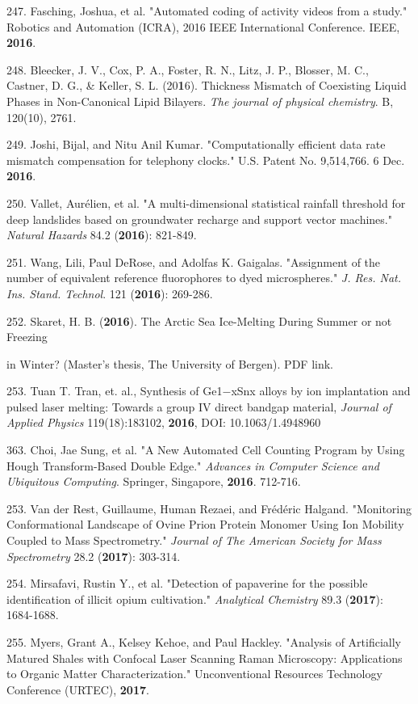 247. Fasching, Joshua, et al. "Automated coding of activity videos from a study." Robotics and Automation (ICRA), 2016 IEEE International Conference. IEEE, \textbf{2016}.

248. Bleecker, J. V., Cox, P. A., Foster, R. N., Litz, J. P., Blosser, M. C., Castner, D. G., \& Keller, S. L. (20\textbf{1}6). Thickness Mismatch of Coexisting Liquid Phases in Non-Canonical Lipid Bilayers. \textit{The journal of physical chemistry}. B, 120(10), 2761.

249. Joshi, Bijal, and Nitu Anil Kumar. "Computationally efficient data rate mismatch compensation for telephony clocks." U.S. Patent No. 9,514,766. 6 Dec. \textbf{2016}.

250. Vallet, Aur\'{e}lien, et al. "A multi-dimensional statistical rainfall threshold for deep landslides based on groundwater recharge and support vector machines." \textit{Natural Hazards} 84.2 (\textbf{2016}): 821-849.

251. Wang, Lili, Paul DeRose, and Adolfas K. Gaigalas. "Assignment of the number of equivalent reference fluorophores to dyed microspheres." \textit{J. Res. Nat. Ins. Stand. Technol}. 121 (\textbf{2016}): 269-286.

252. Skaret, H. B. (\textbf{2016}). The Arctic Sea Ice-Melting During Summer or not Freezing

in Winter? (Master's thesis, The University of Bergen). PDF link.

253. Tuan T. Tran, et. al., Synthesis of Ge1${-}$xSnx alloys by ion implantation and pulsed laser melting: Towards a group IV direct bandgap material, \textit{Journal of Applied Physics} 119(18):183102, \textbf{2016}, DOI: 10.1063/1.4948960

363. Choi, Jae Sung, et al. "A New Automated Cell Counting Program by Using Hough Transform-Based Double Edge." \textit{Advances in Computer Science and Ubiquitous Computing}. Springer, Singapore, \textbf{2016}. 712-716.

253. Van der Rest, Guillaume, Human Rezaei, and Fr\'{e}d\'{e}ric Halgand. "Monitoring Conformational Landscape of Ovine Prion Protein Monomer Using Ion Mobility Coupled to Mass Spectrometry." \textit{Journal of The American Society for Mass Spectrometry} 28.2 (\textbf{2017}): 303-314.

254. Mirsafavi, Rustin Y., et al. "Detection of papaverine for the possible identification of illicit opium cultivation." \textit{Analytical Chemistry} 89.3 (\textbf{2017}): 1684-1688.

255. Myers, Grant A., Kelsey Kehoe, and Paul Hackley. "Analysis of Artificially Matured Shales with Confocal Laser Scanning Raman Microscopy: Applications to Organic Matter Characterization." Unconventional Resources Technology Conference (URTEC), \textbf{2017}.

